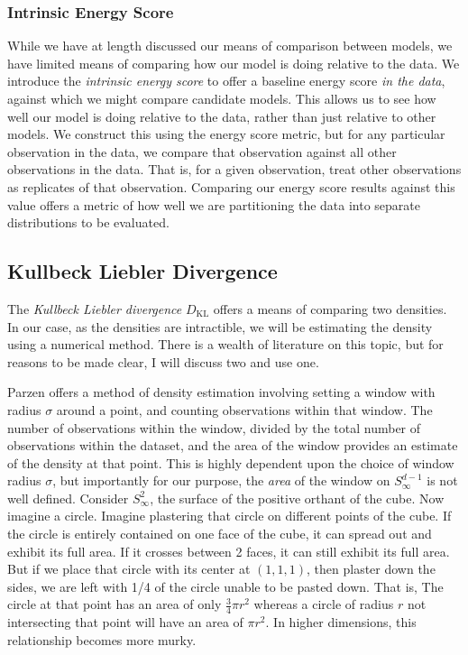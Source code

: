 \subsubsection{Intrinsic Energy Score}
While we have at length discussed our means of comparison between models, we have limited means of
  comparing how our model is doing relative to the data.  We introduce the
  \emph{intrinsic energy score} to offer a baseline energy score \emph{in the data}, against which
  we might compare candidate models.  This allows us to see how well our model is doing relative
  to the data, rather than just relative to other models.  We construct this using the energy score
  metric, but for any particular observation in the data, we compare that observation against all
  other observations in the data.  That is, for a given observation, treat other observations as
  replicates of that observation.  Comparing our energy score results against this value offers a
  metric of how well we are partitioning the data into separate distributions to be evaluated.

\subsection{Kullbeck Liebler Divergence}
The \emph{Kullbeck Liebler divergence} $D_{\text{KL}}$ offers a means of comparing two densities.
  In our case, as the densities are intractible, we will be estimating the density using a numerical
  method.  There is a wealth of literature on this topic, but for reasons to be made clear, I will
  discuss two and use one.

Parzen \cite{parzen1962} offers a method of density estimation involving setting a window with
  radius $\sigma$ around a point, and counting observations within that window.  The number of
  observations within the window, divided by the total number of observations within the dataset,
  and the area of the window provides an estimate of the density at that point. This is highly
  dependent upon the choice of window radius $\sigma$, but importantly for our purpose, the
  \emph{area} of the window on $S_{\infty}^{d-1}$ is not well defined.  Consider $S_{\infty}^{2}$,
  the surface of the positive orthant of the cube.  Now imagine a circle.  Imagine plastering that
  circle on different points of the cube.  If the circle is entirely contained on one face of the
  cube, it can spread out and exhibit its full area.  If it crosses between 2 faces, it can still
  exhibit its full area. But if we place that circle with its center at $(1,1,1)$, then plaster down
  the sides, we are left with 1/4 of the circle unable to be pasted down.  That is, The circle at
  that point has an area of only $\frac{3}{4}\pi r^2$ whereas a circle of radius $r$ not
  intersecting that point will have an area of $\pi r^2$.  In higher dimensions, this relationship
  becomes more murky.

